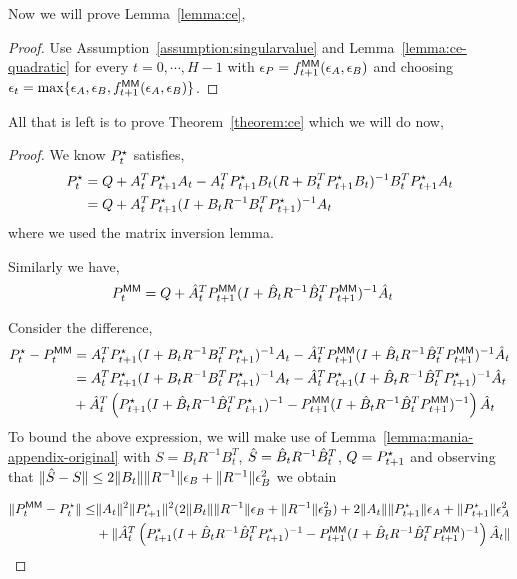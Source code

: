 Now we will prove Lemma~\ref{lemma:ce},
\ceLemma*
\begin{proof}
  Use Assumption~\ref{assumption:singularvalue} and
  Lemma~\ref{lemma:ce-quadratic} for every $t=0, \cdots, H-1$ with
  $\epsilon_P = f^\mathsf{MM}_{t+1}(\epsilon_A, \epsilon_B)$ and choosing $\epsilon_t =
  \max\{\epsilon_A, \epsilon_B, f^\mathsf{MM}_{t+1}(\epsilon_A, \epsilon_B)\}$.
\end{proof}

All that is left is to prove Theorem~\ref{theorem:ce} which we will do
now,
\theoremCE*
\begin{proof}
  We know $P^\star_{t}$ satisfies,
\begin{align*}
  P^\star_{t} &= Q + A_t^{T}P^\star_{{t+1}}A_t - A_t^{T}P^\star_{t+1}B_t(R + B_t^{T}P^\star_{{t+1}}B_t)^{-1}B_t^{T}P^\star_{t+1}A_t \\
  &= Q + A_t^{T}P^\star_{t+1}(I + B_tR^{-1}B_t^{T}P^\star_{t+1})^{-1}A_t
\end{align*}
where we used the matrix inversion lemma.

Similarly we have,
\begin{align*}
  P^\mathsf{MM}_{t} &= Q + \hat{A}_t^{T}P^\mathsf{MM}_{t+1}(I + \hat{B}_t R^{-1}\hat{B}_t^{T}P^\mathsf{MM}_{t+1})^{{-1}}\hat{A}_t
\end{align*}

Consider the difference,
\begin{align*}
  P^\star_{t} - P^\mathsf{MM}_{t} &= A_t^{T}P^\star_{t+1}(I + B_tR^{-1}B_t^{T}P^\star_{t+1})^{-1}A_t - \hat{A}_t^{T}P^\mathsf{MM}_{t+1}(I + \hat{B}_t R^{-1}\hat{B}_t^{T}P^\mathsf{MM}_{t+1})^{{-1}}\hat{A}_t \\
                    &= A_t^{T}P^\star_{t+1}(I + B_tR^{-1}B_t^{T}P^\star_{t+1})^{-1}A_t - \hat{A}_t^{T}P^\star_{t+1}(I + \hat{B}_t R^{-1}\hat{B}_t^{T}P^\star_{t+1})^{{-1}}\hat{A}_t \\
  &+ \hat{A}_t^{T}\left(P^\star_{t+1}(I + \hat{B}_t R^{-1}\hat{B}_t^{T}P^\star_{t+1})^{{-1}} - P^\mathsf{MM}_{t+1}(I + \hat{B}_t R^{-1}\hat{B}_t^{T}P^\mathsf{MM}_{t+1})^{{-1}} \right)\hat{A}_t
\end{align*}
To bound the above expression, we will make use of
Lemma~\ref{lemma:mania-appendix-original} with $S = B_tR^{-1}B_t^{T}$,
$\hat{S} = \hat{B}_t R^{-1}\hat{B}_t^{T}$,
$Q = P^\star_{t+1}$ and observing that
$\|\hat{S} - S\| \leq 2\|B_t\|\|R^{-1}\|\epsilon_B + \|R^{-1}\|\epsilon_B^{2}$ we obtain

\begin{align*}
  \|P^\mathsf{MM}_{t} - P^\star_{t}\| \leq& \|A_t\|^{2}\|P^\star_{t+1}\|^{2}(2\|B_t\|\|R^{-1}\|\epsilon_B + \|R^{-1}\|\epsilon_B^{2}) + 2\|A_t\|\|P^\star_{t+1}\|\epsilon_A + \|P^\star_{t+1}\|\epsilon_A^{2} \\
  &+ \|\hat{A}_t^{T}\left(P^\star_{t+1}(I + \hat{B}_t R^{-1}\hat{B}_t^{T}P^\star_{t+1})^{{-1}} - P^\mathsf{MM}_{t+1}(I + \hat{B}_t R^{-1}\hat{B}_t^{T}P^\mathsf{MM}_{t+1})^{{-1}} \right)\hat{A}_t\|
\end{align*}


\end{proof}
